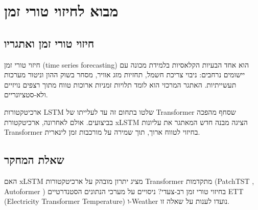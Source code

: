 
\clearpage
\chapter{מבוא לחיזוי טורי זמן}

\section{חיזוי טורי זמן ואתגריו}

חיזוי טורי זמן (\textenglish{time series forecasting}) הוא אחד הבעיות הקלאסיות בלמידת מכונה עם יישומים נרחבים: ניבוי צריכת חשמל, תחזיות מזג אוויר, מסחר בשוק ההון וניטור מערכות תעשייתיות. האתגר המרכזי הוא לומד תלויות זמניות ארוכות טווח מתוך רצפים נויזיים ולא-סטציונריים.

ארכיטקטורות \textenglish{LSTM} \cite{hochreiter1997lstm} שלטו בתחום זה עד לעלייתו של \textenglish{Transformer} \cite{vaswani2017attention} שסחף מהפכה בביצועים. אולם לאחרונה, ארכיטקטורת \textenglish{xLSTM} \cite{beck2024xlstm} הציגה מבנה חדש המאתגר את עליונות \textenglish{Transformer} בחיזוי לטווח ארוך, תוך שמירה על מורכבות זמן לינארית.

\section{שאלת המחקר}

האם \textenglish{xLSTM} מציג יתרון מובהק על ארכיטקטורות \textenglish{Transformer} מתקדמות (\textenglish{PatchTST} \cite{nie2022patchtst}, \textenglish{Autoformer} \cite{wu2021autoformer}) בחיזוי טורי זמן רב-צעדי? ניסויים על מערכי הנתונים הסטנדרטיים \textenglish{ETT} (\textenglish{Electricity Transformer Temperature}) ו-\textenglish{Weather} נועדו לענות על שאלה זו.
